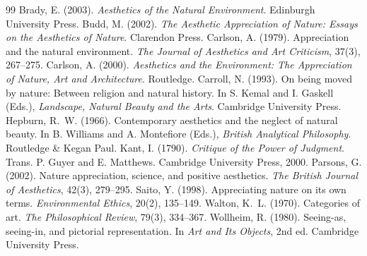 \documentclass{situationist-preprint}
\begin{document}
\begin{thebibliography}{99}\small
{} Brady, E. (2003). \emph{Aesthetics of the Natural Environment}. Edinburgh University Press.
 Budd, M. (2002). \emph{The Aesthetic Appreciation of Nature: Essays on the Aesthetics of Nature}. Clarendon Press.
 Carlson, A. (1979). Appreciation and the natural environment. \emph{The Journal of Aesthetics and Art Criticism}, 37(3), 267--275.
 Carlson, A. (2000). \emph{Aesthetics and the Environment: The Appreciation of Nature, Art and Architecture}. Routledge.
 Carroll, N. (1993). On being moved by nature: Between religion and natural history. In S. Kemal and I. Gaskell (Eds.), \emph{Landscape, Natural Beauty and the Arts}. Cambridge University Press.
 Hepburn, R.~W. (1966). Contemporary aesthetics and the neglect of natural beauty. In B. Williams and A. Montefiore (Eds.), \emph{British Analytical Philosophy}. Routledge \& Kegan Paul.
 Kant, I. (1790). \emph{Critique of the Power of Judgment}. Trans. P. Guyer and E. Matthews. Cambridge University Press, 2000.
 Parsons, G. (2002). Nature appreciation, science, and positive aesthetics. \emph{The British Journal of Aesthetics}, 42(3), 279--295.
 Saito, Y. (1998). Appreciating nature on its own terms. \emph{Environmental Ethics}, 20(2), 135--149.
 Walton, K.~L. (1970). Categories of art. \emph{The Philosophical Review}, 79(3), 334--367.
 Wollheim, R. (1980). Seeing-as, seeing-in, and pictorial representation. In \emph{Art and Its Objects}, 2nd ed. Cambridge University Press.
\end{thebibliography}
\end{document}
